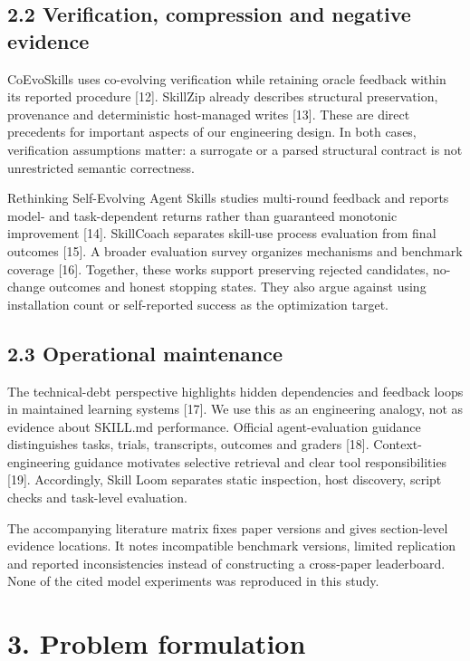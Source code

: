 \documentclass[
  11pt,
]{article}
\begin{document}
\subsection{2.2 Verification, compression and negative
evidence}\label{verification-compression-and-negative-evidence}

CoEvoSkills uses co-evolving verification while retaining oracle
feedback within its reported procedure {[}12{]}. SkillZip already
describes structural preservation, provenance and deterministic
host-managed writes {[}13{]}. These are direct precedents for important
aspects of our engineering design. In both cases, verification
assumptions matter: a surrogate or a parsed structural contract is not
unrestricted semantic correctness.

Rethinking Self-Evolving Agent Skills studies multi-round feedback and
reports model- and task-dependent returns rather than guaranteed
monotonic improvement {[}14{]}. SkillCoach separates skill-use process
evaluation from final outcomes {[}15{]}. A broader evaluation survey
organizes mechanisms and benchmark coverage {[}16{]}. Together, these
works support preserving rejected candidates, no-change outcomes and
honest stopping states. They also argue against using installation count
or self-reported success as the optimization target.

\subsection{2.3 Operational maintenance}\label{operational-maintenance}

The technical-debt perspective highlights hidden dependencies and
feedback loops in maintained learning systems {[}17{]}. We use this as
an engineering analogy, not as evidence about SKILL.md performance.
Official agent-evaluation guidance distinguishes tasks, trials,
transcripts, outcomes and graders {[}18{]}. Context-engineering guidance
motivates selective retrieval and clear tool responsibilities {[}19{]}.
Accordingly, Skill Loom separates static inspection, host discovery,
script checks and task-level evaluation.

The accompanying literature matrix fixes paper versions and gives
section-level evidence locations. It notes incompatible benchmark
versions, limited replication and reported inconsistencies instead of
constructing a cross-paper leaderboard. None of the cited model
experiments was reproduced in this study.

\section{3. Problem formulation}\label{problem-formulation}
\end{document}
